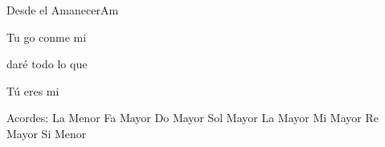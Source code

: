 \documentclass[12pt, spanish]{book}
\begin{document}
\begin{song}{Desde el Amanecer}{Am}
\begin{SBOpGroup}
            Tu go conme mi 
        \end{SBOpGroup}

        \begin{SBOpGroup}
             daré todo lo que 

            Tú eres mi 
        \end{SBOpGroup}

        \ifChordBk
        \begin{SBOpGroup}
            Acordes:
            \upchord{\Am}\qquad La Menor \hfill
            \upchord{\F}\qquad Fa Mayor \hfill\null\break
            \upchord{\C}\qquad Do Mayor \hfill
            \upchord{\G}\qquad Sol Mayor \hfill\null\break
            \upchord{\A}\qquad La Mayor \hfill
            \upchord{\E}\qquad Mi Mayor \hfill\null\break
            \upchord{\D}\qquad Re Mayor \hfill
            \upchord{\Bm}\qquad Si Menor \hfill\null\break
        \end{SBOpGroup}
        \fi
    \end{song}
\end{document}
